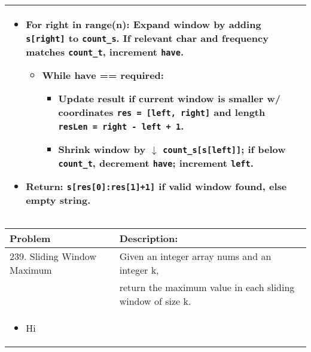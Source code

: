 \begin{summary}
\begin{center}
\begin{tabular}{ll}
{\begin{itemize}
                    \item \textbf{For right in range(n):} Expand window by adding \texttt{s[right]} to \texttt{count\_s}. If relevant char and frequency matches \texttt{count\_t}, increment \texttt{have}.
                    
                    \begin{itemize}
                        \item \textbf{While have == required:}
                        \begin{itemize}
                            \item Update result if current window is smaller w/ coordinates \texttt{res = [left, right]} and length \texttt{resLen = right - left + 1}.
                            \item Shrink window by $\downarrow$ \texttt{count\_s[s[left]]}; if below \texttt{count\_t}, decrement \texttt{have}; increment \texttt{left}.
                        \end{itemize}
                    \end{itemize}
                    
                    \item \textbf{Return:} \texttt{s[res[0]:res[1]+1]} if valid window found, else empty string.
                \end{itemize}                
            } \\
            \bottomrule
        \end{tabular}
    \end{center}
\end{summary}
\newpage

\begin{summary}
    \begin{center}
        \begin{tabular}{ll}
            \toprule
            \textbf{Problem} & \textbf{Description:} \\
            \midrule
            239. Sliding Window Maximum & Given an integer array nums and an integer k, \\
            & return the maximum value in each sliding window of size k. \\
            \multicolumn{2}{p{\linewidth}}{
                \begin{itemize}
                    \item Hi
                \end{itemize}                
            } \\
            \bottomrule
        \end{tabular}
    \end{center}
\end{summary}